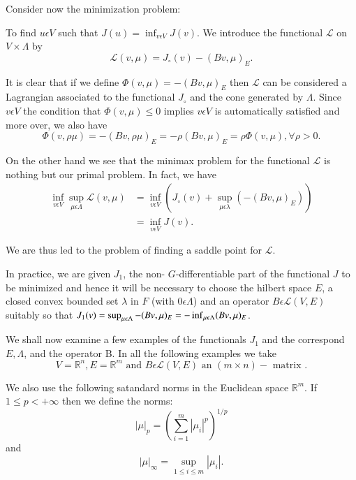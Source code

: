 Consider now the minimization problem:

\medskip
{} To find $u \epsilon V$ such that $J(u) = \inf_{v \epsilon V} J(v)$. We introduce the functional $\mathscr{L}$ on $V \times \Lambda$ by
\begin{equation*}
\mathscr{L} (v, \mu) = J_{\circ} (v) - (Bv, \mu)_{E}.\tag{4.7}\label{chap5-eq4.7}
\end{equation*}

It is clear that if we define $\Phi (v, \mu) = -(Bv, \mu)_{E}$ then $\mathscr{L}$ can be considered a Lagrangian associated to the functional $J_{\circ}$ and the cone generated by $\Lambda$. Since $v \epsilon V$ the condition that $\Phi (v, \mu) \leq 0$ implies $v \epsilon V$ is automatically satisfied and more over, we also have
$$
\Phi (v, \rho \mu) = -(Bv, \rho \mu)_{E} = -\rho(Bv, \mu)_{E} = \rho \Phi (v, \mu), \forall \rho > 0.
$$

On the other hand we see that the minimax problem for the functional $\mathscr{L}$ is nothing but our primal problem. In fact, we have
\begin{align*}
\inf_{v \epsilon V} \sup_{\mu \epsilon \Lambda} \mathscr{L} (v, \mu) & = \inf_{v \epsilon V} (J_{\circ}(v) + \sup_{\mu \epsilon \lambda} (-(Bv, \mu)_{E}))\tag{4.8}\label{chap5-eq4.8}\\
& = \inf_{v \epsilon V} J(v).
\end{align*}

We are thus led to the problem of finding a saddle point for $\mathscr{L}$.

\begin{remark}%
In practice, we are given $J_{1}$, the non- $G$-differentiable part of the functional $J$ to be minimized and hence it will be necessary to choose the hilbert space $E$, a closed convex bounded set $\lambda$ in $F$ (with $0 \epsilon \Lambda$) and an operator $B \epsilon \mathscr{L} (V, E)$ suitably so that $J_{1}(v) = \sup_{\mu \epsilon \Lambda} -\break (Bv, \mu)_{E} = -\inf_{\mu \epsilon \Lambda} (Bv, \mu)_{E}$.
\end{remark}

We shall now examine a few examples of the functionals $J_{1}$ and the correspond $E, \Lambda$, and the operator B. In all the following examples we take
$$
V = \mathbb{R}^{n}, E = \mathbb{R}^{m} \text{ and } B \epsilon \mathscr{L}(V, E) \text{ an } (m \times n) - \text{ matrix }.
$$\pageoriginale

We also use the following satandard norms in the Euclidean space $\mathbb{R}^{m}$. If $1 \leq p < + \infty$ then we define the norms:
$$
|\mu|_{p} = (\sum_{i=1}^{m} |\mu_{i}|^{p})^{1/p}
$$
and
$$
|\mu|_{\infty} = \sup_{1 \leq i \leq m} |\mu_{i}|.
$$


